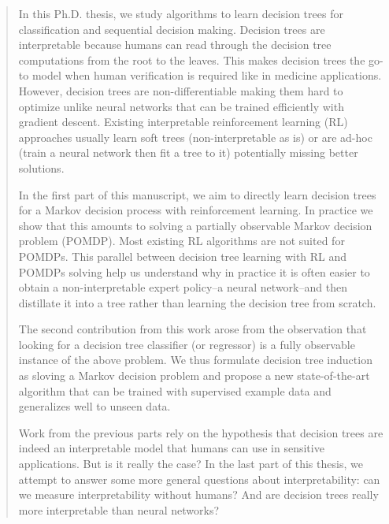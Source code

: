 \begin{abstract}
  In this Ph.D. thesis, we study algorithms to learn decision trees for classification and sequential decision making. Decision trees are interpretable because humans can read through the decision tree computations from the root to the leaves. This makes decision trees the go-to model when human verification is required like in medicine applications. However, decision trees are non-differentiable making them hard to optimize unlike neural networks that can be trained efficiently with gradient descent. Existing interpretable reinforcement learning (RL) approaches usually learn soft trees (non-interpretable as is) or are ad-hoc (train a neural network then fit a tree to it) potentially missing better solutions.

  In the first part of this manuscript, we aim to directly learn decision trees for a Markov decision process with reinforcement learning. In practice we show that this amounts to solving a partially observable Markov decision problem (POMDP). Most existing RL algorithms are not suited for POMDPs. This parallel between decision tree learning with RL and POMDPs solving help us understand why in practice it is often easier to obtain a non-interpretable expert policy--a neural network--and then distillate it into a tree rather than learning the decision tree from scratch.

  The second contribution from this work arose from the observation that looking for a decision tree classifier (or regressor) is a fully observable instance of the above problem. We thus formulate decision tree induction as sloving a Markov decision problem and propose a new state-of-the-art algorithm that can be trained with supervised example data and generalizes well to unseen data.

  Work from the previous parts rely on the hypothesis that decision trees are indeed an interpretable model that humans can use in sensitive applications. But is it really the case? In the last part of this thesis, we attempt to answer some more general questions about interpretability: can we measure interpretability without humans? And are decision trees really more interpretable than neural networks?
\end{abstract}
%
\makeabstract{}

